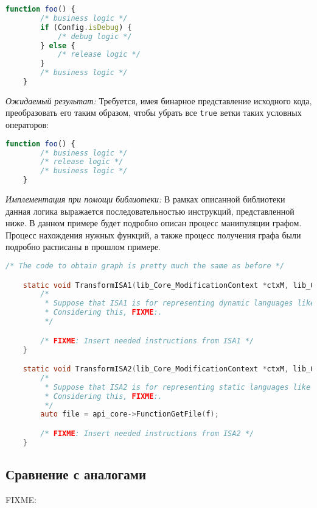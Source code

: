 \begin{lstlisting}[language=javascript, label=lst:]
    function foo() {
        /* business logic */
        if (Config.isDebug) {
            /* debug logic */
        } else {
            /* release logic */
        }
        /* business logic */
    }
\end{lstlisting}

\textit{Ожидаемый результат:} Требуется, имея бинарное представление исходного кода, преобразовать его таким образом, чтобы убрать все \texttt{true} ветки таких условных операторов:

\begin{lstlisting}[language=javascript, label=lst:]
    function foo() {
        /* business logic */
        /* release logic */
        /* business logic */
    }
\end{lstlisting}

\textit{Имплементация при помощи библиотеки:} В рамках описанной библиотеки данная логика выражается последовательностью инструкций, представленной ниже. В данном примере будет подробно описан процесс манипуляции графом. Процесс нахождения нужных функций, а также процесс получения графа были подробно расписаны в прошлом примере.

\begin{lstlisting}[language=C, label=lst:]
    /* The code to obtain graph is pretty much the same as before */

    static void TransformISA1(lib_Core_ModificationContext *ctxM, lib_Core_Function* f, lib_Core_Graph* g) {
        /*
         * Suppose that ISA1 is for representing dynamic languages like JavaScript.
         * Considering this, FIXME:.
         */

        /* FIXME: Insert needed instructions from ISA1 */
    }

    static void TransformISA2(lib_Core_ModificationContext *ctxM, lib_Core_Function* f, lib_Core_Graph* g) {
        /*
         * Suppose that ISA2 is for representing static languages like Java.
         * Considering this, FIXME:.
         */
        auto file = api_core->FunctionGetFile(f);

        /* FIXME: Insert needed instructions from ISA2 */
    }
\end{lstlisting}

\subsection{Сравнение с аналогами}

FIXME:
